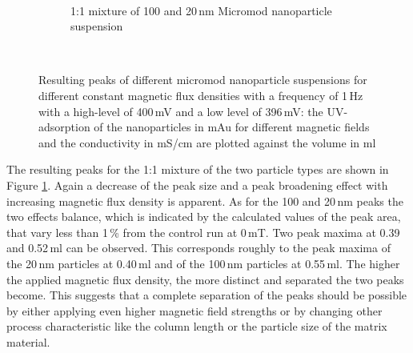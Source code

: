 \begin{figure}[H]
\begin{subfigure}{0.49\textwidth}
        \end{subfigure}
        \\
        	\centering
            \begin{subfigure}{0.49\textwidth}
                  \flushleft
                  \caption{1:1 mixture of 100 and 20\,nm Micromod nanoparticle suspension}\label{subfig:micromod_mix_peak}
          \end{subfigure}\hfill
          \\
        \caption[Resulting peaks of different micromod nanoparticle suspensions for different constant magnetic flux densities]{Resulting peaks of different micromod nanoparticle suspensions for different constant magnetic flux densities with a frequency of 1\,Hz with a high-level of 400\,mV and a low level of 396\,mV: the UV-adsorption of the nanoparticles in mAu for different magnetic fields and the conductivity in mS/cm are plotted against the volume in ml}
        \label{fig:micromod_peaks}
  \end{figure}

The resulting peaks for the 1:1 mixture of the two particle types are shown in Figure \ref{subfig:micromod_mix_peak}. Again a decrease of the peak size and a peak broadening effect with increasing magnetic flux density is apparent. As for the 100 and 20\,nm peaks the two effects balance, which is indicated by the calculated values of the peak area, that vary less than 1\,\% from the control run at 0\,mT. Two peak maxima at 0.39 and 0.52\,ml can be observed. This corresponds roughly to the peak maxima of the 20\,nm particles at 0.40\,ml and of the 100\,nm particles at 0.55\,ml. The higher the applied magnetic flux density, the more distinct and separated the two peaks become. This suggests that a complete separation of the peaks should be possible by either applying even higher magnetic field strengths or by changing other process characteristic like the column length or the particle size of the matrix material.
     
